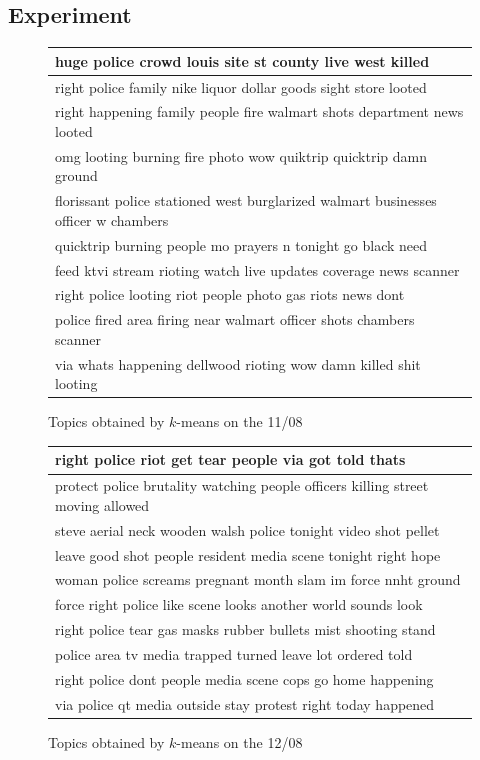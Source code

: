 \documentclass[a4paper,twoside,12pt,openright]{report}
\begin{document}
\subsection{Experiment}
\begin{figure}[H]
  \centering
\begin{tabular}{l}
\hline
huge police crowd louis site st county live west killed \\ \hline
right police family nike liquor dollar goods sight store looted \\ \hline
right happening family people fire walmart shots department news looted \\ \hline
omg looting burning fire photo wow quiktrip quicktrip damn ground \\ \hline
florissant police stationed west burglarized walmart businesses officer w chambers \\ \hline
quicktrip burning people mo prayers n tonight go black need \\ \hline
feed ktvi stream rioting watch live updates coverage news scanner \\ \hline
right police looting riot people photo gas riots news dont \\ \hline
police fired area firing near walmart officer shots chambers scanner \\ \hline
via whats happening dellwood rioting wow damn killed shit looting \\ \hline
\end{tabular}
\caption{Topics obtained by $k$-means on the 11/08}
\end{figure}

\begin{figure}[H]
  \centering
\begin{tabular}{l}
\hline
right police riot get tear people via got told thats \\ \hline
protect police brutality watching people officers killing street moving allowed \\ \hline
steve aerial neck wooden walsh police tonight video shot pellet \\ \hline
leave good shot people resident media scene tonight right hope \\ \hline
woman police screams pregnant month slam im force nnht ground \\ \hline
force right police like scene looks another world sounds look \\ \hline
right police tear gas masks rubber bullets mist shooting stand \\ \hline
police area tv media trapped turned leave lot ordered told \\ \hline
right police dont people media scene cops go home happening \\ \hline
via police qt media outside stay protest right today happened \\ \hline
\end{tabular}
\caption{Topics obtained by $k$-means on the 12/08}
\end{figure}
\end{document}
